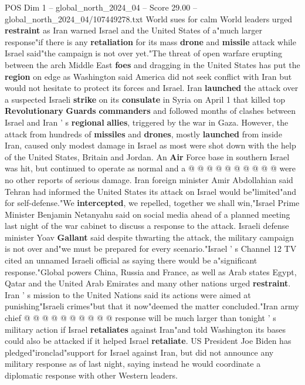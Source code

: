 \begin{textsample}{POS Dim 1 – global\_north\_2024\_04 – Score 29.00 – global\_north\_2024\_04/107449278.txt}  \label{ex:f1_pos_155}
World sues for calm World leaders urged \textbf{restraint} as Iran warned Israel and the United States of a"much larger response"if there is any \textbf{retaliation} for its mass \textbf{drone} and \textbf{missile} attack while Israel said"the campaign is not over yet."The threat of open warfare erupting between the arch Middle East \textbf{foes} and dragging in the United States has put the \textbf{region} on edge as Washington said America did not seek conflict with Iran but would not hesitate to protect its forces and Israel.
Iran \textbf{launched} the attack over a suspected Israeli \textbf{strike} on its \textbf{consulate} in Syria on April 1 that killed top \textbf{Revolutionary} \textbf{Guards} \textbf{commanders} and followed months of clashes between Israel and Iran ' s \textbf{regional} \textbf{allies}, triggered by the war in Gaza.
However, the attack from hundreds of \textbf{missiles} and \textbf{drones}, mostly \textbf{launched} from inside Iran, caused only modest damage in Israel as most were shot down with the help of the United States, Britain and Jordan.
An \textbf{Air} Force base in southern Israel was hit, but continued to operate as normal and a @ @ @ @ @ @ @ @ @ @ were no other reports of serious damage.
Iran foreign minister Amir Abdollahian said Tehran had informed the United States its attack on Israel would be"limited"and for self-defense."We \textbf{intercepted}, we repelled, together we shall win,"Israel Prime Minister Benjamin Netanyahu said on social media ahead of a planned meeting last night of the war cabinet to discuss a response to the attack.
Israeli defense minister Yoav \textbf{Gallant} said despite thwarting the attack, the military campaign is not over and"we must be prepared for every scenario."Israel ' s Channel 12 TV cited an unnamed Israeli official as saying there would be a"significant response."Global powers China, Russia and France, as well as Arab states Egypt, Qatar and the United Arab Emirates and many other nations urged \textbf{restraint}.
Iran ' s mission to the United Nations said its actions were aimed at punishing"Israeli crimes"but that it now"deemed the matter concluded."Iran army chief @ @ @ @ @ @ @ @ @ @ response will be much larger than tonight ' s military action if Israel \textbf{retaliates} against Iran"and told Washington its bases could also be attacked if it helped Israel \textbf{retaliate}.
US President Joe Biden has pledged"ironclad"support for Israel against Iran, but did not announce any military response as of last night, saying instead he would coordinate a diplomatic response with other Western leaders.

\end{textsample}
